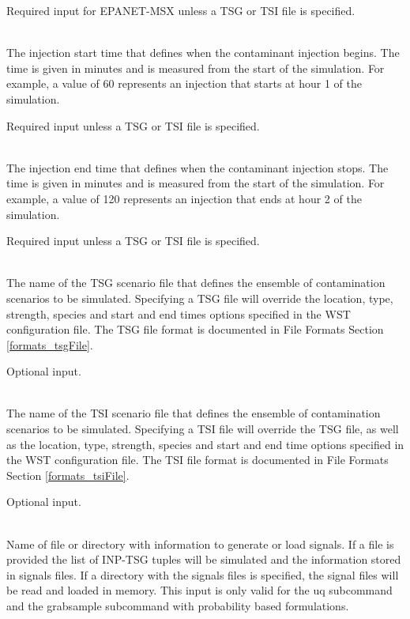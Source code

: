 \begin{description}[topsep=0pt,parsep=0.5em,itemsep=-0.4em]
\begin{description}[topsep=0pt,parsep=0.5em,itemsep=-0.4em]
                Required input for EPANET-MSX unless a TSG or TSI file is specified.
    \item[{start time}]\hfill
\\The injection start time that defines when the contaminant injection begins. 
                The time is given in minutes and is measured from the start of the simulation. 
                For example, a value of 60 represents an injection that starts at hour 1 of the simulation.
                
                Required input unless a TSG or TSI file is specified.
    \item[{end time}]\hfill
\\The injection end time that defines when the contaminant injection stops.				
                The time is given in minutes and is measured from the start of the simulation.
                For example, a value of 120 represents an injection that ends at hour 2 of the simulation.
                
                Required input unless a TSG or TSI file is specified.
    \item[{tsg file}]\hfill
\\The name of the TSG scenario file that defines the ensemble of contamination
                scenarios to be simulated. Specifying a TSG file will
                override the location, type, strength, species and start and end times options specified in
                the WST configuration file. The TSG file format is documented in File Formats Section \ref{formats_tsgFile}.
                
                Optional input.
    \item[{tsi file}]\hfill
\\The name of the TSI scenario file that defines the ensemble of contamination
                scenarios to be simulated. Specifying a TSI file will
                override the TSG file, as well as the location, type, strength, species and start and end time options specified in
                the WST configuration file. The TSI file format is documented in File Formats Section \ref{formats_tsiFile}.
                
                Optional input.
    \item[{signals}]\hfill
\\Name of file or directory with information to generate 
                or load signals. If a file is provided the list of INP-TSG tuples
                 will be simulated and the information stored in signals files. If
                a directory with the signals files is specified, the signal files will
                be read and loaded in memory. This input is only valid for the uq
                subcommand and the grabsample subcommand with probability based formulations.


\end{description}
\end{description}
